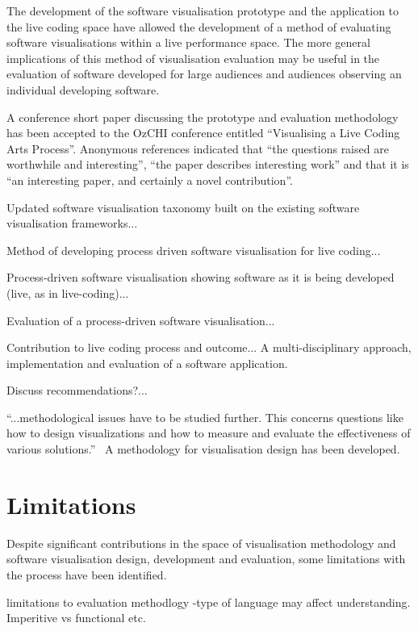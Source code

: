 The development of the software visualisation prototype and the application to the live coding space have allowed the development of a method of evaluating software visualisations within a live performance space. The more general implications of this method of visualisation evaluation may be useful in the evaluation of software developed for large audiences and audiences observing an individual developing software.

A conference short paper discussing the prototype and evaluation methodology has been accepted to the OzCHI conference entitled ``Visualising a Live Coding Arts Process''. Anonymous references indicated that ``the questions raised are worthwhile and interesting'', ``the paper describes interesting work'' and that it is ``an interesting paper, and certainly a novel contribution''.


Updated software visualisation taxonomy built on the existing software visualisation frameworks...

Method of developing process driven software visualisation for live coding...

Process-driven software visualisation showing software as it is being developed (live, as in live-coding)...

Evaluation of a process-driven software visualisation...

Contribution to live coding process and outcome... A multi-disciplinary approach, implementation and evaluation of a software application.

Discuss recommendations?...

``...methodological issues have to be studied further. This concerns questions like how to design visualizations and how to measure and evaluate the effectiveness of various solutions.''~\cite{VanWijk2005} A methodology for visualisation design has been developed.


\section{Limitations}

Despite significant contributions in the space of visualisation methodology and software visualisation design, development and evaluation, some limitations with the process have been identified.

limitations to evaluation methodlogy
-type of language may affect understanding. Imperitive vs functional etc.

